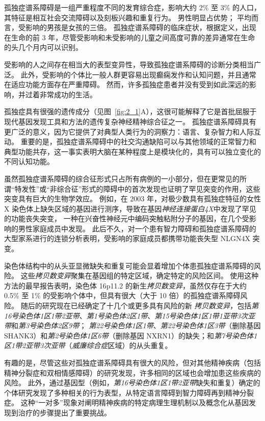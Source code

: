 孤独症谱系障碍是一组严重程度不同的发育综合症，影响大约 2\% 至 3\% 的人口，其特征是相互社会交流障碍以及刻板兴趣和重复行为。
男性明显占优势；
平均而言，受影响的男孩是女孩的三倍。
孤独症谱系障碍的临床症状，根据定义，出现在生命的前 3 年，尽管受影响和未受影响的儿童之间高度可靠的差异通常在生命的头几个月内可以识别。


受影响的人之间存在相当大的表型变异性，导致孤独症谱系障碍的诊断分类相当广泛。
此外，受影响的个体比一般人群更容易出现癫痫发作和认知问题，并且通常在适应功能方面存在严重障碍。
然而，许多孤独症患者并没有受到如此深远的影响，并过着非常成功的生活。


孤独症具有很强的遗传成分（见图~\ref{fig:2_1}A），这很可能解释了它是首批屈服于现代基因发现工具和方法的遗传复杂神经精神综合征之一。
孤独症谱系障碍具有更广泛的意义，因为它提供了对典型人类行为的洞察力：语言、复杂智力和人际互动。
重要的是，孤独症谱系障碍中的社交沟通缺陷可以与其他领域的正常智力和典型功能共存，这一事实表明大脑在某种程度上是模块化的，具有可以独立变化的不同认知功能。


虽然孤独症谱系障碍的综合征形式只占所有病例的一小部分，但在更常见的所谓“特发性”或“非综合征”形式的障碍中的首次发现也证明了罕见突变的作用，这些突变具有巨大的生物学效应。
例如，在 2003 年，对极少数具有孤独症特征的女性 X 染色体上缺失区域的基因进行测序，导致在基因\textit{神经连接蛋白4X}中发现了罕见的功能丧失突变， 一种在兴奋性神经元中编码突触粘附分子的基因，在几个受影响的男性家庭成员中发现。
此后不久，对一个患有智力障碍和孤独症谱系障碍的大型家系进行的连锁分析表明，受影响的家庭成员都携带功能丧失型 NLGN4X 突变。


染色体结构中的从头亚显微缺失和重复可能会显着增加个体患孤独症谱系障碍的风险。
这些\textit{拷贝数变异}聚集在基因组的特定区域，确定特定的风险区间。 使用这种方法的最早报告表明，染色体 16p11.2 的新生\textit{拷贝数变异}，虽然仅存在于大约 0.5\% 至 1\% 的受影响个体中，但具有很大（大于 10 倍）的孤独症谱系障碍风险。
随后的研究现在已经确定了十几个或更多具有风险的新 \textit{拷贝数变异}，包括\textit{第16号染色体1区1带2亚带}、\textit{第1号染色体2区1带}、\textit{第15号染色体1区1带1亚带3次亚带}和\textit{第3号染色体2区9带}；
\textit{第22号染色体1区1带}、\textit{第22号染色体1区3带}（删除基因 SHANK3）和\textit{第2号染色体1区6带}（删除基因 NXRN1）的缺失；和\textit{第7号染色体1区1带2亚带3次亚带}（\textit{威廉综合症}区域）的从头重复。


有趣的是，尽管这些对孤独症谱系障碍具有很大的风险，但对其他精神疾病（包括精神分裂症和双相情感障碍）的研究发现，许多相同的区域也会增加患这些疾病的风险。
此外，通过基因型（例如，\textit{第16号染色体1区1带2亚带}缺失和重复）确定的个体研究发现了多种相关的行为表型，从特定语言障碍到智力障碍再到精神分裂症。
这种“一对多”现象对阐明精神疾病的特定病理生理机制以及概念化从基因发现到治疗的步骤提出了重要挑战。


